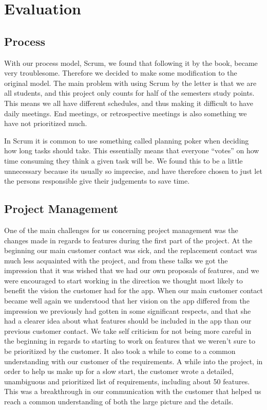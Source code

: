 \section{Evaluation}
\thispagestyle{plain}
	\subsection{Process}

With our process model, Scrum, we found that following it by the book, became very troublesome. Therefore we decided to make some modification to the original model. The main problem with using Scrum by the letter is that we are all students, and this project only counts for half of the semesters study points. This means we all have different schedules, and thus making it difficult to have daily meetings. End meetings, or retrospective meetings is also something we have not prioritized much.

In Scrum it is common to use something called planning poker when deciding how long tasks should take. This essentially means that everyone “votes” on how time consuming they think a given task will be. We found this to be a little unnecessary because its usually so imprecise, and have therefore chosen to just let the persons responsible give their judgements to save time. 

	\subsection{Project Management}

One of the main challenges for us concerning project management was the changes made in regards to features during the first part of the project. At the beginning our main customer contact was sick, and the replacement contact was much less acquainted with the project, and from these talks we got the impression that it was wished that we had our own proposals of features, and we were encouraged to start working in the direction we thought most likely to benefit the vision the customer had for the app. When our main customer contact became well again we understood that her vision on the app differed from the impression we previously had gotten in some significant respects, and that she had a clearer idea about what features should be included in the app than our previous customer contact. We take self criticism for not being more careful in the beginning in regards to starting to work on features that we weren’t sure to be prioritized by the customer. It also took a while to come to a common understanding with our customer of the requirements. A while into the project, in order to help us make up for a slow start, the customer wrote a detailed, unambiguous and prioritized list of requirements, including about 50 features. This was a breakthrough in our communication with the customer that helped us reach a common understanding of both the large picture and the details.

